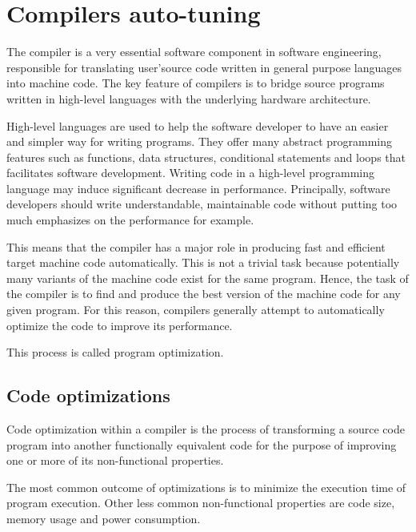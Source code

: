 



\section{Compilers auto-tuning}
The compiler is a very essential software component in software engineering, responsible for translating user'source code written in general purpose languages into machine code. The key feature of compilers is to bridge source programs written in high-level languages with the underlying hardware architecture.

High-level languages are used to help the software developer to have an easier and simpler way for writing programs. They offer many abstract programming features such as functions, data structures, conditional statements and loops that facilitates software development.
Writing code in a high-level programming language may induce significant decrease in performance. Principally, software developers should write understandable, maintainable code without putting too much emphasizes on the performance for example. 

This means that the compiler has a major role in producing fast and efficient target machine code automatically. This is not a trivial task because potentially many variants of the machine code exist for the same program. Hence, the task of the compiler is to find and produce the best version of the machine code for any given program. For this reason, compilers generally attempt to automatically optimize the code to improve its performance.

This process is called program optimization. 
\subsection{Code optimizations}

Code optimization within a compiler is the process of transforming a source code program into another functionally equivalent code for the purpose of improving one or more of its non-functional properties. 

The most common outcome of optimizations is to minimize the execution time of program execution. Other less common non-functional properties are code size, memory usage and power consumption. 

